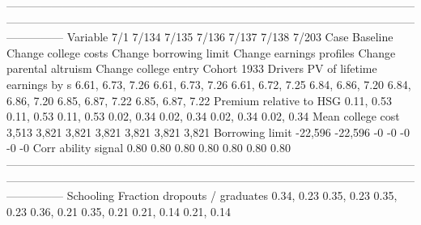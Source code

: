 ---------------------------------------------------------------------------------------------------------------------------------------------------------------------------------------------------------------------------------------
                              Variable                          7/1                        7/134                    7/135                     7/136                       7/137                       7/138                       7/203
                                  Case                     Baseline         Change college costs   Change borrowing limit  Change earnings profiles    Change parental altruism        Change college entry                 Cohort 1933
                               Drivers                                                                                                                                                                                                 
          PV of lifetime earnings by s             6.61, 6.73, 7.26             6.61, 6.73, 7.26         6.61, 6.72, 7.25          6.84, 6.86, 7.20            6.84, 6.86, 7.20            6.85, 6.87, 7.22            6.85, 6.87, 7.22
               Premium relative to HSG                   0.11, 0.53                   0.11, 0.53               0.11, 0.53                0.02, 0.34                  0.02, 0.34                  0.02, 0.34                  0.02, 0.34
                     Mean college cost                        3,513                        3,821                    3,821                     3,821                       3,821                       3,821                       3,821
                       Borrowing limit                      -22,596                      -22,596                       -0                        -0                          -0                          -0                          -0
                   Corr ability signal                         0.80                         0.80                     0.80                      0.80                        0.80                        0.80                        0.80
---------------------------------------------------------------------------------------------------------------------------------------------------------------------------------------------------------------------------------------
                             Schooling                                                                                                                                                                                                 
         Fraction dropouts / graduates                   0.34, 0.23                   0.35, 0.23               0.35, 0.23                0.36, 0.21                  0.35, 0.21                  0.21, 0.14                  0.21, 0.14
